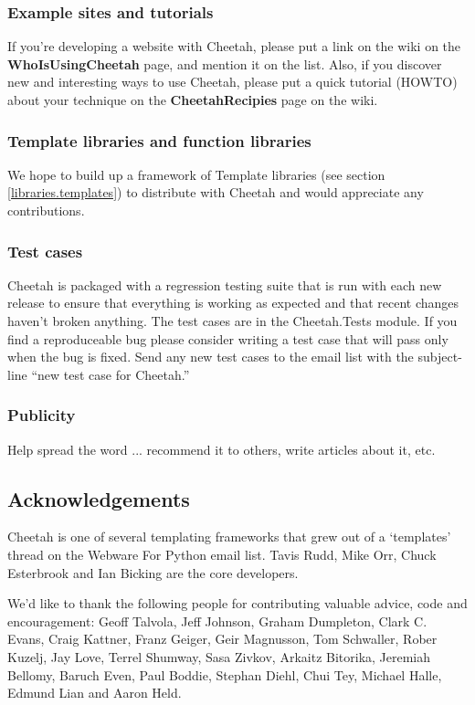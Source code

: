 \subsubsection{Example sites and tutorials}
If you're developing a website with Cheetah, please put a link on the wiki on
the {\bf WhoIsUsingCheetah} page, and mention it on the list.  Also, if you
discover new and interesting ways to use Cheetah, please put a quick tutorial
(HOWTO) about your technique on the {\bf CheetahRecipies} page on the wiki.

\subsubsection{Template libraries and function libraries}
We hope to build up a framework of Template libraries (see section
\ref{libraries.templates}) to distribute with Cheetah and would appreciate any
contributions.

\subsubsection{Test cases}
Cheetah is packaged with a regression testing suite that is run with each
new release to ensure that everything is working as expected and that recent
changes haven't broken anything.  The test cases are in the Cheetah.Tests
module.  If you find a reproduceable bug please consider writing a test case
that will pass only when the bug is fixed.  Send any new test cases to the email
list with the subject-line ``new test case for Cheetah.''

\subsubsection{Publicity}
Help spread the word ... recommend it to others, write articles about it, etc.

\subsection{Acknowledgements}
\label{intro.acknowledgments}
    
Cheetah is one of several templating frameworks that grew out of a `templates'
thread on the Webware For Python email list.  Tavis Rudd, Mike Orr, Chuck
Esterbrook and Ian Bicking are the core developers.

We'd like to thank the following people for contributing valuable advice, code
and encouragement: Geoff Talvola, Jeff Johnson, Graham Dumpleton, Clark C.
Evans, Craig Kattner, Franz Geiger, Geir Magnusson, Tom Schwaller, Rober Kuzelj,
Jay Love, Terrel Shumway, Sasa Zivkov, Arkaitz Bitorika, Jeremiah Bellomy,
Baruch Even, Paul Boddie, Stephan Diehl, Chui Tey, Michael Halle, Edmund Lian
and Aaron Held.
    
